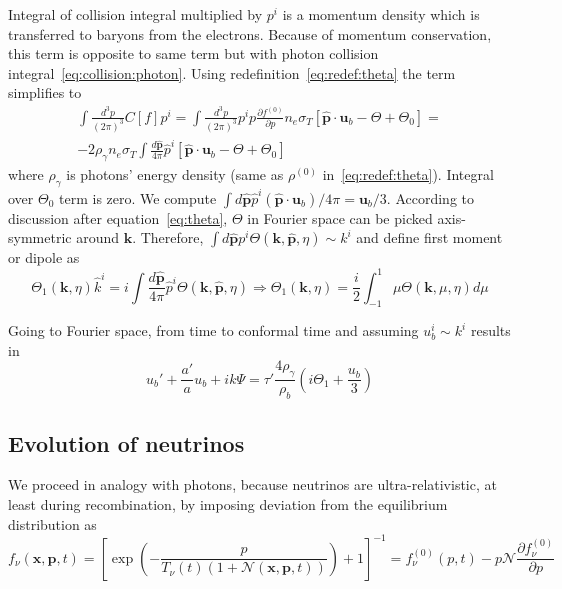 \documentclass[12pt]{extarticle}
\numberwithin{problem}{section}
\numberwithin{theorem}{section}
\begin{document}
	Integral of collision integral multiplied by $p^i$ is a momentum density which is transferred to baryons from the electrons. Because of momentum conservation, this term is opposite to same term but with photon collision integral~\ref{eq:collision:photon}. Using redefinition~\ref{eq:redef:theta} the term simplifies to
	\begin{multline}
		\int \frac{d^3p}{(2\pi)^3} C[f]p^i = \int\frac{d^3p}{(2\pi)^3} p^ip\frac{\partial f^{(0)}}{\partial p}n_e\sigma_T\left[\mathbf{\hat{p}}\cdot\mathbf{u}_b - \Theta + \Theta_0\right] =\\
		-2\rho_\gamma n_e\sigma_T\int\frac{d\mathbf{\hat{p}}}{4\pi}\hat{p}^i[\mathbf{\hat{p}}\cdot\mathbf{u}_b - \Theta + \Theta_0]
	\end{multline}
	where $\rho_\gamma$ is photons' energy density (same as $\rho^{(0)}$ in~\ref{eq:redef:theta}). Integral over $\Theta_0$ term is zero. We compute $\int d\mathbf{\hat{p}} \hat{p}^i(\mathbf{\hat{p}}\cdot\mathbf{u}_b)/4\pi = \mathbf{u}_b / 3$. According to discussion after equation~\ref{eq:theta}, $\Theta$ in Fourier space can be picked axis-symmetric around $\mathbf{k}$. Therefore, $\int d\mathbf{\hat{p}} p^i \Theta(\mathbf{k}, \mathbf{\hat{p}}, \eta)\sim k^i$ and define first moment or dipole as
	\begin{equation}
		\Theta_1(\mathbf{k}, \eta)\hat{k}^i = i\int \frac{d\mathbf{\hat{p}}}{4\pi} \hat{p}^i\Theta(\mathbf{k}, \mathbf{\hat{p}}, \eta)\Rightarrow\Theta_1(\mathbf{k}, \eta) = \frac{i}{2}\int^{1}_{-1}\mu\Theta(\mathbf{k},\mu,\eta) d\mu
	\end{equation}
	
	Going to Fourier space, from time to conformal time and assuming $u^i_b\sim k^i$ results in 
	\begin{equation}
		u_b' + \frac{a'}{a}u_b + ik\Psi = \tau'\frac{4\rho_\gamma}{\rho_b}\left(i\Theta_1 + \frac{u_b}{3}\right)		
	\end{equation}

	\subsection{Evolution of neutrinos}
	We proceed in analogy with photons, because neutrinos are ultra-relativistic, at least during recombination, by imposing deviation from the equilibrium distribution as
	\begin{equation}
		f_\nu(\mathbf{x}, \mathbf{p}, t) = \left[\exp\left(-\frac{p}{T_\nu(t)(1 + \mathcal{N}(\mathbf{x}, \mathbf{p}, t))}\right) + 1\right]^{-1} = f_\nu^{(0)}(p, t) - p\mathcal{N}\frac{\partial f_\nu^{(0)}}{\partial p}
	\end{equation}
\end{document}
